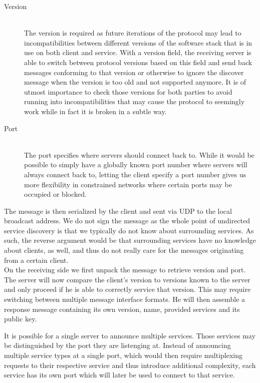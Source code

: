 \begin{description}
    \item[Version]\hfill\\
        The version is required as future iterations of the protocol may lead to incompatibilities between different versions of the software stack that is in use on both client and service.
        With a version field, the receiving server is able to switch between protocol versions based on this field and send back messages conforming to that version or otherwise to ignore the discover message when the version is too old and not supported anymore.
        It is of utmost importance to check those versions for both parties to avoid running into incompatibilities that may cause the protocol to seemingly work while in fact it is broken in a subtle way.
    \item[Port]\hfill\\
        The port specifies where servers should connect back to.
        While it would be possible to simply have a globally known port number where servers will always connect back to, letting the client specify a port number gives us more flexibility in constrained networks where certain ports may be occupied or blocked.
\end{description}

The message is then serialized by the client and sent via UDP to the local broadcast address.
We do not sign the message as the whole point of undirected service discovery is that we typically do not know about surrounding services.
As such, the reverse argument would be that surrounding services have no knowledge about clients, as well, and thus do not really care for the messages originating from a certain client.\\

On the receiving side we first unpack the message to retrieve version and port.
The server will now compare the client's version to versions known to the server and only proceed if he is able to correctly service that version.
This may require switching between multiple message interface formats.
He will then assemble a response message containing its own version, name, provided services and its public key.

It is possible for a single server to announce multiple services.
Those services may be distinguished by the port they are listenging at.
Instead of announcing multiple service types at a single port, which would then require multiplexing requests to their respective service and thus introduce additional complexity, each service has its own port which will later be used to connect to that service.


